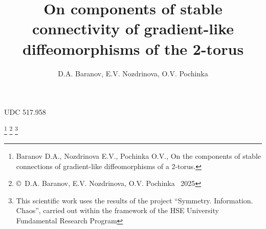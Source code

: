\documentclass{amsart}
\def\udcs{517.958} %
\numberwithin{equation}{section}
\begin{document}
	
	UDC \udcs
	\thispagestyle{empty}
	
	
	\title[On components of stable connectivity\dots]{On components of stable connectivity of gradient-like diffeomorphisms of the 2-torus}
	
	
	\author{D.A. Baranov, E.V. Nozdrinova, O.V. Pochinka}
	
	\address{Denis Alekseevich Baranov,
		\newline\hphantom{iii} HSE University,
		\newline\hphantom{iii}Bolshaya Pecherskaya str., 25/12
		\newline\hphantom{iii} 603155, Nizhny Novgorod, Russia
	}
	
	\address{Elena Vyacheslavovna Nozdrinova,
		\newline\hphantom{iii} HSE University,
		\newline\hphantom{iii}Bolshaya Pecherskaya str., 25/12
		\newline\hphantom{iii} 603155, Nizhny Novgorod, Russia
	}
	\address{Olga Vitalievna Pochinka,
		\newline\hphantom{iii} HSE University,
		\newline\hphantom{iii}Bolshaya Pecherskaya str., 25/12
		\newline\hphantom{iii} 603155, Nizhny Novgorod, Russia
	}
	
	\thanks{\sc Baranov D.A., Nozdrinova E.V., Pochinka O.V., On the components of stable connections of gradient-like diffeomorphisms of a 2-torus.}
	\thanks{\copyright \ D.A. Baranov, E.V. Nozdrinova, O.V. Pochinka \ 2025}
	\thanks{\rm This scientific work uses the results of the project ``Symmetry. Information. Chaos'', carried out within the framework of the HSE University Fundamental Research Program}
	
\end{document}
